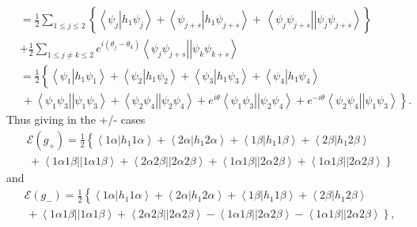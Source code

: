 \documentclass[aps,preprint]{revtex4}%
\begin{document}
\begin{align*}
&  =\frac{1}{2}\sum_{1\leq j\leq2}\left\{  \overset{}{\left\langle \psi
_{j}\left\vert h_{1}\psi_{j}\right.  \right\rangle +\left\langle \psi
_{j+s}\left\vert h_{1}\psi_{j+s}\right.  \right\rangle }+\,\left\langle
\psi_{j}\psi_{j+s}\right\vert \left\vert \psi_{j}\psi_{j+s}\right\rangle
\right\} \\
&  +\frac{1}{2}\sum_{1\leq j\neq k\leq2}e^{i\left(  \theta_{j}-\theta
_{k}\right)  }\left\langle \psi_{j}\psi_{j+s}\right\vert \left\vert \psi
_{k}\psi_{k+s}\right\rangle \\
&  =\frac{1}{2}\left\{  \overset{}{\left\langle \psi_{1}\left\vert h_{1}%
\psi_{1}\right.  \right\rangle +\left\langle \psi_{2}\left\vert h_{1}\psi
_{2}\right.  \right\rangle +\left\langle \psi_{3}\left\vert h_{1}\psi
_{3}\right.  \right\rangle +\left\langle \psi_{4}\left\vert h_{1}\psi
_{4}\right.  \right\rangle }\right. \\
&  \left.  \,+\left\langle \psi_{1}\psi_{3}\right\vert \left\vert \psi_{1}%
\psi_{3}\right\rangle +\left\langle \psi_{2}\psi_{4}\right\vert \left\vert
\psi_{2}\psi_{4}\right\rangle +e^{i\theta}\left\langle \psi_{1}\psi
_{3}\right\vert \left\vert \psi_{2}\psi_{4}\right\rangle +e^{-i\theta
}\left\langle \psi_{2}\psi_{4}\right\vert \left\vert \psi_{1}\psi
_{3}\right\rangle \overset{}{}\right\}  .
\end{align*}
Thus giving in the +/- cases%
\begin{align*}
&  \mathcal{E}\left(  g_{+}\right)  =\frac{1}{2}\left\{  \overset
{}{\left\langle 1\alpha\left\vert h_{1}1\alpha\right.  \right\rangle
+\left\langle 2\alpha\left\vert h_{1}2\alpha\right.  \right\rangle
+\left\langle 1\beta\left\vert h_{1}1\beta\right.  \right\rangle +\left\langle
2\beta\left\vert h_{1}2\beta\right.  \right\rangle }\right. \\
&  \left.  \,+\left\langle 1\alpha1\beta\right\vert \left\vert 1\alpha
1\beta\right\rangle +\left\langle 2\alpha2\beta\right\vert \left\vert
2\alpha2\beta\right\rangle +\left\langle 1\alpha1\beta\right\vert \left\vert
2\alpha2\beta\right\rangle +\left\langle 1\alpha1\beta\right\vert \left\vert
2\alpha2\beta\right\rangle \overset{}{}\right\}
\end{align*}
and
\begin{align*}
&  \mathcal{E}\left(  g_{-}\right)  =\frac{1}{2}\left\{  \overset
{}{\left\langle 1\alpha\left\vert h_{1}1\alpha\right.  \right\rangle
+\left\langle 2\alpha\left\vert h_{1}2\alpha\right.  \right\rangle
+\left\langle 1\beta\left\vert h_{1}1\beta\right.  \right\rangle +\left\langle
2\beta\left\vert h_{1}2\beta\right.  \right\rangle }\right. \\
&  \left.  \,+\left\langle 1\alpha1\beta\right\vert \left\vert 1\alpha
1\beta\right\rangle +\left\langle 2\alpha2\beta\right\vert \left\vert
2\alpha2\beta\right\rangle -\left\langle 1\alpha1\beta\right\vert \left\vert
2\alpha2\beta\right\rangle -\left\langle 1\alpha1\beta\right\vert \left\vert
2\alpha2\beta\right\rangle \overset{}{}\right\}  ,
\end{align*}
\end{document}
